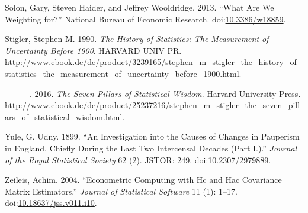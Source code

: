 \documentclass[]{article}
\begin{document}
\hypertarget{ref-SolonHaiderWooldridge2013a}{}
Solon, Gary, Steven Haider, and Jeffrey Wooldridge. 2013. ``What Are We
Weighting for?'' National Bureau of Economic Research.
doi:\href{https://doi.org/10.3386/w18859}{10.3386/w18859}.

\hypertarget{ref-Stigler1990a}{}
Stigler, Stephen M. 1990. \emph{The History of Statistics: The
Measurement of Uncertainty Before 1900}. HARVARD UNIV PR.
\url{http://www.ebook.de/de/product/3239165/stephen_m_stigler_the_history_of_statistics_the_measurement_of_uncertainty_before_1900.html}.

\hypertarget{ref-Stigler2016a}{}
---------. 2016. \emph{The Seven Pillars of Statistical Wisdom}. Harvard
University Press.
\url{http://www.ebook.de/de/product/25237216/stephen_m_stigler_the_seven_pillars_of_statistical_wisdom.html}.

\hypertarget{ref-Yule1899a}{}
Yule, G. Udny. 1899. ``An Investigation into the Causes of Changes in
Pauperism in England, Chiefly During the Last Two Intercensal Decades
(Part I.).'' \emph{Journal of the Royal Statistical Society} 62 (2).
JSTOR: 249. doi:\href{https://doi.org/10.2307/2979889}{10.2307/2979889}.

\hypertarget{ref-Zeileis2004a}{}
Zeileis, Achim. 2004. ``Econometric Computing with Hc and Hac Covariance
Matrix Estimators.'' \emph{Journal of Statistical Software} 11 (1):
1--17.
doi:\href{https://doi.org/10.18637/jss.v011.i10}{10.18637/jss.v011.i10}.
\end{document}
